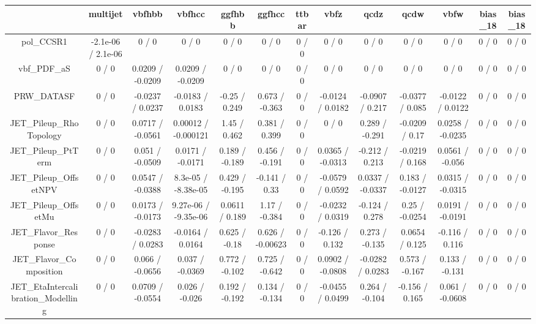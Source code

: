 \documentclass[10pt]{article}
\begin{document}
\begin{table}[htbp]
\begin{center}
\begin{tabular}{|c|c|c|c|c|c|c|c|c|c|c|c|c|}
\hline 
      & multijet      & vbfhbb      & vbfhcc      & ggfhbb      & ggfhcc      & ttbar      & vbfz      & qcdz      & qcdw      & vbfw      & bias_18      & bias_18 \\ 
\hline 
  pol_CCSR1 & -2.1e-06 / 2.1e-06 & 0 / 0 & 0 / 0 & 0 / 0 & 0 / 0 & 0 / 0 & 0 / 0 & 0 / 0 & 0 / 0 & 0 / 0 & 0 / 0 & 0 / 0 \\ 
  vbf_PDF_aS & 0 / 0 & 0.0209 / -0.0209 & 0.0209 / -0.0209 & 0 / 0 & 0 / 0 & 0 / 0 & 0 / 0 & 0 / 0 & 0 / 0 & 0 / 0 & 0 / 0 & 0 / 0 \\ 
  PRW_DATASF & 0 / 0 & -0.0237 / 0.0237 & -0.0183 / 0.0183 & -0.25 / 0.249 & 0.673 / -0.363 & 0 / 0 & -0.0124 / 0.0182 & -0.0907 / 0.217 & -0.0377 / 0.085 & -0.0122 / 0.0122 & 0 / 0 & 0 / 0 \\ 
  JET_Pileup_RhoTopology & 0 / 0 & 0.0717 / -0.0561 & 0.00012 / -0.000121 & 1.45 / 0.462 & 0.381 / 0.399 & 0 / 0 & 0 / 0 & 0.289 / -0.291 & -0.0209 / 0.17 & 0.0258 / -0.0235 & 0 / 0 & 0 / 0 \\ 
  JET_Pileup_PtTerm & 0 / 0 & 0.051 / -0.0509 & 0.0171 / -0.0171 & 0.189 / -0.189 & 0.456 / -0.191 & 0 / 0 & 0.0365 / -0.0313 & -0.212 / 0.213 & -0.0219 / 0.168 & 0.0561 / -0.056 & 0 / 0 & 0 / 0 \\ 
  JET_Pileup_OffsetNPV & 0 / 0 & 0.0547 / -0.0388 & 8.3e-05 / -8.38e-05 & 0.429 / -0.195 & -0.141 / 0.33 & 0 / 0 & -0.0579 / 0.0592 & 0.0337 / -0.0337 & 0.183 / -0.0127 & 0.0315 / -0.0315 & 0 / 0 & 0 / 0 \\ 
  JET_Pileup_OffsetMu & 0 / 0 & 0.0173 / -0.0173 & 9.27e-06 / -9.35e-06 & 0.0611 / 0.189 & 1.17 / -0.384 & 0 / 0 & -0.0232 / 0.0319 & -0.124 / 0.278 & 0.25 / -0.0254 & 0.0191 / -0.0191 & 0 / 0 & 0 / 0 \\ 
  JET_Flavor_Response & 0 / 0 & -0.0283 / 0.0283 & -0.0164 / 0.0164 & 0.625 / -0.18 & 0.626 / -0.00623 & 0 / 0 & -0.126 / 0.132 & 0.273 / -0.135 & 0.0654 / 0.125 & -0.116 / 0.116 & 0 / 0 & 0 / 0 \\ 
  JET_Flavor_Composition & 0 / 0 & 0.066 / -0.0656 & 0.037 / -0.0369 & 0.772 / -0.102 & 0.725 / -0.642 & 0 / 0 & 0.0902 / -0.0808 & -0.0282 / 0.0283 & 0.573 / -0.167 & 0.133 / -0.131 & 0 / 0 & 0 / 0 \\ 
  JET_EtaIntercalibration_Modelling & 0 / 0 & 0.0709 / -0.0554 & 0.026 / -0.026 & 0.192 / -0.192 & 0.134 / -0.134 & 0 / 0 & -0.0455 / 0.0499 & 0.264 / -0.104 & -0.156 / 0.165 & 0.061 / -0.0608 & 0 / 0 & 0 / 0 \\ 

\end{tabular}
\end{center}
\end{table}
\end{document}
